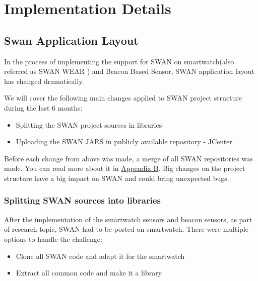 
\chapter{Implementation Details} %

\label{Chapter5} %



\section{Swan Application Layout}
In the process of implementing the support for SWAN on smartwatch(also referred as SWAN WEAR ) and Beacon Based Sensor, SWAN application layout has changed dramatically.

We will cover the following main changes applied to SWAN project structure during the last 6 months:
\begin{itemize}
 \item Splitting the SWAN project sources in libraries
 \item Uploading the SWAN JARS in publicly available repository - JCenter
\end{itemize}

Before each change  from above was made,  a merge of all SWAN repositories was made. You can read more about it in \hyperref[AppendixB]{Appendix B}.
Big changes on the project structure have a big impact on SWAN and could bring unexpected bugs.


\subsection{Splitting SWAN sources into libraries}\label{scc:swan_split}
After the implementation of the smartwatch sensors and beacon sensors, as part of research topic, SWAN had to be ported on smartwatch.
There were multiple options to handle the challenge:
\begin{itemize}
 \item Clone all SWAN code and adapt it for the smartwatch
 \item Extract all common code and make it a library
\end{itemize}


